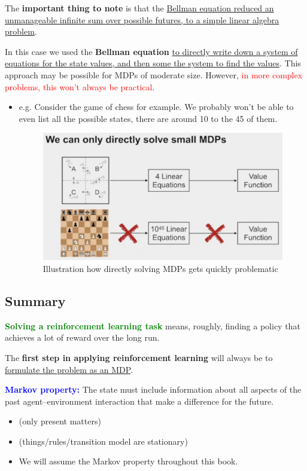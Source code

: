 \documentclass[12pt, a4paper]{article}
\begin{document}
The \textbf{important thing to note} is that the \uline{Bellman equation reduced an unmanageable infinite sum over possible futures, to a simple linear algebra problem}.

In this case we used the \textbf{Bellman equation} \uline{to directly write down a system of equations for the state values, and then some the system to find the values}. This approach may be possible for MDPs of moderate size. However, \textcolor{Red}{in more complex problems, this won't always be practical}.

\begin{itemize}
  \item e.g. Consider the game of chess for example. We probably won't be able to even list all the possible states, there are around 10 to the 45 of them.

  \begin{figure}[H]
    \centering  %
      \includegraphics[width=0.8\columnwidth]{images/gridworld-eg2.png}
      \caption{Illustration how directly solving MDPs gets quickly problematic}
      \label{fig:gridworld-eg}
  \end{figure}

\end{itemize}




\subsection{Summary}\label{summary}

\textcolor{Green}{\textbf{Solving a reinforcement learning task}} means, roughly, finding a policy that achieves a lot of reward over the long run.

The \textbf{first step in applying reinforcement learning} will always be to \uline{formulate the problem as an MDP}.

\textcolor{blue}{\textbf{Markov property:}} The state must include information about all aspects of the past agent--environment interaction that make a
difference for the future.
\begin{itemize}
  \item (only present matters)
  \item (things/rules/transition model are stationary)
  \item We will assume the
  Markov property throughout this book.
\end{itemize}
\end{document}
